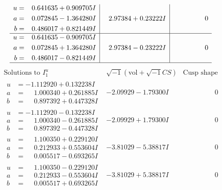 \documentclass[1p]{elsarticle_modified}
\theoremstyle{definition}
\newcommand{\I}{\sqrt{-1}}
\begin{document}
$$\begin{array}{c|c|c}
\begin{aligned}
u &= \phantom{-}0.641635 + 0.909705 I \\
a &= \phantom{-}0.072845 - 1.364280 I \\
b &= \phantom{-}0.486017 + 0.821449 I\end{aligned}
 & \phantom{-}2.97384 + 0.23222 I & \phantom{-0.000000 } 0 \\ \hline\begin{aligned}
u &= \phantom{-}0.641635 - 0.909705 I \\
a &= \phantom{-}0.072845 + 1.364280 I \\
b &= \phantom{-}0.486017 - 0.821449 I\end{aligned}
 & \phantom{-}2.97384 - 0.23222 I & \phantom{-0.000000 } 0\\
 \hline 
 \end{array}$$\newpage$$\begin{array}{c|c|c}  
\text{Solutions to }I^u_{1}& \I (\text{vol} + \sqrt{-1}CS) & \text{Cusp shape}\\
 \hline 
\begin{aligned}
u &= -1.112920 + 0.132238 I \\
a &= \phantom{-}1.000340 + 0.261885 I \\
b &= \phantom{-}0.897392 + 0.447328 I\end{aligned}
 & -2.09929 - 1.79300 I & \phantom{-0.000000 } 0 \\ \hline\begin{aligned}
u &= -1.112920 - 0.132238 I \\
a &= \phantom{-}1.000340 - 0.261885 I \\
b &= \phantom{-}0.897392 - 0.447328 I\end{aligned}
 & -2.09929 + 1.79300 I & \phantom{-0.000000 } 0 \\ \hline\begin{aligned}
u &= \phantom{-}1.100350 + 0.229120 I \\
a &= \phantom{-}0.212933 + 0.553604 I \\
b &= \phantom{-}0.005517 - 0.693265 I\end{aligned}
 & -3.81029 - 5.38817 I & \phantom{-0.000000 } 0 \\ \hline\begin{aligned}
u &= \phantom{-}1.100350 - 0.229120 I \\
a &= \phantom{-}0.212933 - 0.553604 I \\
b &= \phantom{-}0.005517 + 0.693265 I\end{aligned}
 & -3.81029 + 5.38817 I & \phantom{-0.000000 } 0 \\ \hline\begin{aligned}

\end{aligned}
\end{array}$$
\end{document}
